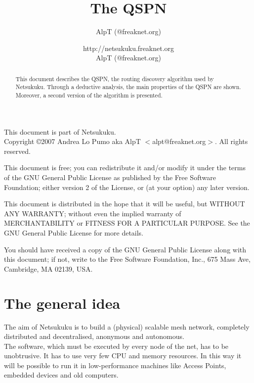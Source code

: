 \documentclass[a4paper]{article}
\title{The QSPN}
\author{AlpT (@freaknet.org)}
\author{http://netsukuku.freaknet.org\\AlpT (@freaknet.org)}
\begin{document}
\maketitle

\begin{abstract}
	This document describes the QSPN, the routing discovery algorithm used
	by Netsukuku.
	Through a deductive analysis, the main properties of the QSPN are
	shown. Moreover, a second version of the algorithm is presented.
\end{abstract}
\pagebreak
\begin{small}
  This document is part of Netsukuku.\\
  Copyright \copyright 2007 Andrea Lo Pumo aka AlpT $<$alpt@freaknet.org$>$.
  All rights reserved.

  This document is free; you can redistribute it and/or modify it
  under the terms of the GNU General Public License as published by
  the Free Software Foundation; either version 2 of the License, or
  (at your option) any later version.

  This document is distributed in the hope that it will be useful, but
  WITHOUT ANY WARRANTY; without even the implied warranty of
  MERCHANTABILITY or FITNESS FOR A PARTICULAR PURPOSE\@.  See the GNU
  General Public License for more details.

  You should have received a copy of the GNU General Public License
  along with this document; if not, write to the Free Software
  Foundation, Inc., 675 Mass Ave, Cambridge, MA 02139, USA.
\end{small}

\clearpage
\tableofcontents
\clearpage
{}

\section{The general idea}
\label{sec:general_idea}

The aim of Netsukuku is to build a (physical) scalable mesh network, completely
distributed and decentralised, anonymous and autonomous.\\

The software, which must be executed by every node of the net, has to be
unobtrusive. It has to use very few CPU and memory resources. In this way it
will be possible to run it in low-performance machines like Access Points,
embedded devices and old computers.\\
\end{document}
